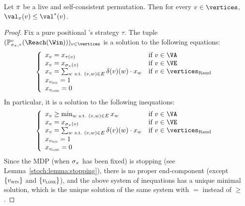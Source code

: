 \begin{lemma}
  Let $\pi$ be a live and self-consistent permutation.  Then for
  every $v \in \vertices$,  $\val_\perm(v) \le \val^*(v)$.
\end{lemma}

\begin{proof}
  Fix a pure positional \Adam's strategy $\tau$. The tuple
  $(\probm_{\sigma_\perm,\tau}^v(\Reach(\Win)))_{v \in \vertices}$ is
  a
  solution to the following equations:
  \[
  \left\{\begin{array}{ll} x_v =
      x_{\tau(v)} & \text{if}\ v \in \Adamvertices \\
      x_v = x_{\sigma_\perm(v)} & \text{if}\ v \in \Evevertices \\
      x_v = \sum_{w\ \text{s.t.}\ (v,w) \in E} \delta(v)(w) \cdot
      x_w  & \text{if}\ v \in \Randomvertices \\
      x_{\vwin} = 1 \\
      x_{\vlose} = 0
    \end{array}\right.
  \]
  In particular, it is a solution to the following inequations:
  \[
  \left\{\begin{array}{ll} 
      x_v \ge \min_{w\ \text{s.t.}\ (v,w) \in E}
      x_w & \text{if}\ v \in \Adamvertices \\
      x_v = x_{\sigma_\perm(v)}  & \text{if}\ v \in \Evevertices \\
      x_v = \sum_{w\ \text{s.t.}\ (v,w) \in E} \delta(v)(w) \cdot x_w
      & \text{if}\ v \in \Randomvertices \\
      x_{\vwin} = 1 \\
      x_{\vlose} = 0
    \end{array}\right.
  \]
  Since the MDP (when $\sigma_\pi$ has been fixed) is stopping (see
  Lemma~\ref{stoch:lemma:stopping}), there is no proper end-component
  (except $\{v_{\textsc{win}}\}$ and $\{v_{\textsc{lose}}\}$), and the above system of
  inequations has a unique minimal solution, which is the unique
  solution of the same system with $=$ instead of $\ge$.


\end{proof}
